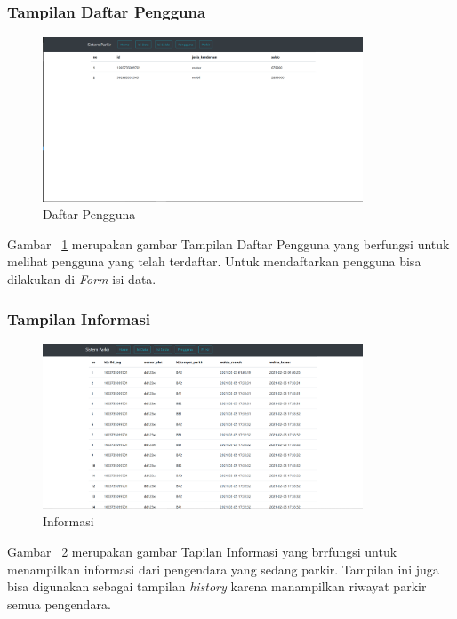 \subsubsection{Tampilan Daftar Pengguna}
\begin{figure} [H]
    \includegraphics[width=0.85\textwidth, center]{images/web 4 pengguna.png}
    \caption{Daftar Pengguna}
    \label{fig:web4pengguna}
\end{figure}

Gambar ~\ref{fig:web4pengguna} merupakan gambar Tampilan Daftar Pengguna yang berfungsi untuk melihat pengguna yang telah terdaftar. Untuk mendaftarkan pengguna bisa dilakukan di \textit{Form} isi data.

\subsubsection{Tampilan Informasi}
\begin{figure} [H]
    \includegraphics[width=0.85\textwidth, center]{images/web 5 informasi.png}
    \caption{Informasi}
    \label{fig:web5informasi}
\end{figure}

Gambar ~\ref{fig:web5informasi} merupakan gambar Tapilan Informasi yang brrfungsi untuk menampilkan informasi dari pengendara yang sedang parkir. Tampilan ini juga bisa digunakan sebagai tampilan \textit{history} karena manampilkan riwayat parkir semua pengendara.